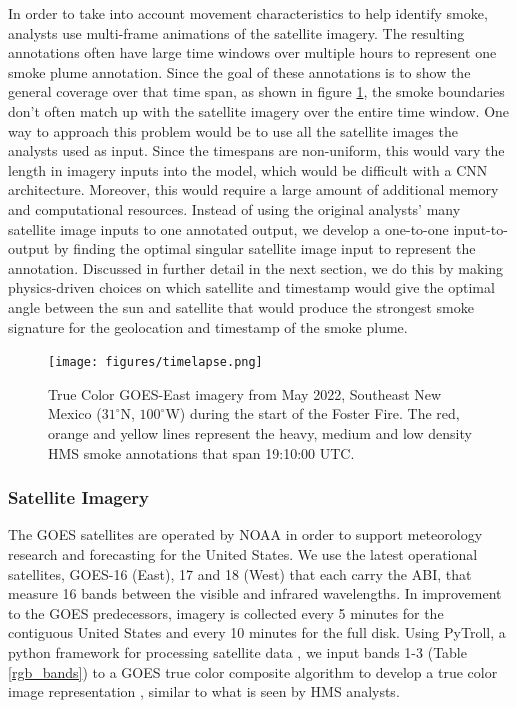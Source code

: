 \documentclass{article}
\begin{document}
In order to take into account movement characteristics to help identify smoke, analysts use multi-frame animations of the satellite imagery. The resulting annotations often have large time windows over multiple hours to represent one smoke plume annotation. Since the goal of these annotations is to show the general coverage over that time span, as shown in figure \ref{timelapse}, the smoke boundaries don't often match up with the satellite imagery over the entire time window. One way to approach this problem would be to use all the satellite images the analysts used as input. Since the timespans are non-uniform, this would vary the length in imagery inputs into the model, which would be difficult with a CNN architecture. Moreover, this would require a large amount of additional memory and computational resources. Instead of using the original analysts' many satellite image inputs to one annotated output, we develop a one-to-one input-to-output by finding the optimal singular satellite image input to represent the annotation. Discussed in further detail in the next section, we do this by making physics-driven choices on which satellite and timestamp would give the optimal angle between the sun and satellite that would produce the strongest smoke signature for the geolocation and timestamp of the smoke plume.


\begin{figure} \label{timelapse}
    \centering
    \texttt{[image: figures/timelapse.png]}
    \caption{True Color GOES-East imagery from May 2022, Southeast New Mexico (\(31^{\circ}\)N, \(100^{\circ}\)W) during the start of the Foster Fire. The red, orange and yellow lines represent the heavy, medium and low density HMS smoke annotations that span 19:10:00 UTC.}
\end{figure}


\subsubsection*{Satellite Imagery} 

The GOES satellites are operated by NOAA in order to support meteorology research and forecasting for the United States. We use the latest operational satellites, GOES-16 (East), 17 and 18 (West) that each carry the ABI, that measure 16 bands between the visible and infrared wavelengths. In improvement to the GOES predecessors, imagery is collected every 5 minutes for the contiguous United States and every 10 minutes for the full disk. Using PyTroll, a python framework for processing satellite data \cite{satpy}, we input bands 1-3 (Table \ref{rgb_bands}) to a GOES true color composite algorithm to develop a true color image representation \cite{true_color}, similar to what is seen by HMS analysts.
\end{document}
